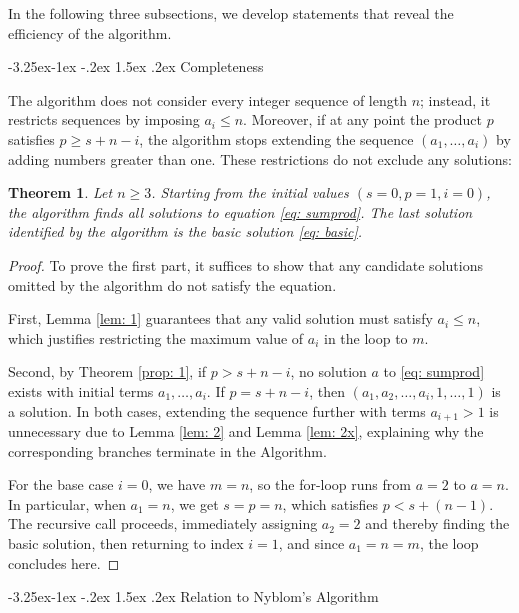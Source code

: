 \documentclass[10pt]{article}
\makeatletter
\renewcommand\subsection{\@startsection{subsection}{2}{\z@}
  {-3.25ex\@plus -1ex \@minus -.2ex}
  {1.5ex \@plus .2ex}
  {\normalfont\normalsize\bfseries\boldmath}}
\newtheorem{theorem}{Theorem}
\theoremstyle{definition}
\theoremstyle{remark}
\numberwithin{equation}{section}
\makeatother
\begin{document}
In the following three subsections, we develop statements that reveal the efficiency of the algorithm. 

\subsection{Completeness}

The algorithm does not consider every integer sequence of length \( n \); instead, it restricts sequences by imposing \( a_i \leq n \). Moreover, if at any point the product \( p \) satisfies \( p \geq s + n - i \), the algorithm stops extending the sequence \( (a_1, \dots, a_i) \) by adding numbers greater than one. These restrictions do not exclude any solutions:

\begin{theorem}\label{th: alg}
Let $n\geq 3$. Starting from the initial values \((s=0, p=1, i=0)\), the algorithm finds all solutions to equation \eqref{eq: sumprod}. The last solution identified by the algorithm is the basic solution \eqref{eq: basic}.
\end{theorem}
\begin{proof}
To prove the first part, it suffices to show that any candidate solutions omitted by the algorithm do not satisfy the equation.

First, Lemma \ref{lem: 1} guarantees that any valid solution must satisfy \( a_i \leq n \), which justifies restricting the maximum value of \( a_i \) in the loop to \( m \).

Second, by Theorem \ref{prop: 1}, if \( p > s + n - i \), no solution \( a \) to \eqref{eq: sumprod} exists with initial terms \( a_1, \dots, a_i \). If \( p = s + n - i \), then \( (a_1, a_2, \dots, a_i, 1, \dots, 1) \) is a solution. In both cases, extending the sequence further with terms \( a_{i+1} > 1 \) is unnecessary due to Lemma \ref{lem: 2} and Lemma \ref{lem: 2x}, explaining why the corresponding branches terminate in the Algorithm.

For the base case \( i=0 \), we have \( m = n \), so the for-loop runs from \( a = 2 \) to \( a = n \). In particular, when \( a_1 = n \), we get \( s = p = n \), which satisfies \( p < s + (n - 1) \). The recursive call proceeds, immediately assigning \( a_2 = 2 \) and thereby finding the basic solution, then returning to index $i=1$, and since \( a_1 = n=m \), the loop concludes here.
\end{proof}


\subsection{Relation to Nyblom's Algorithm}
\end{document}
